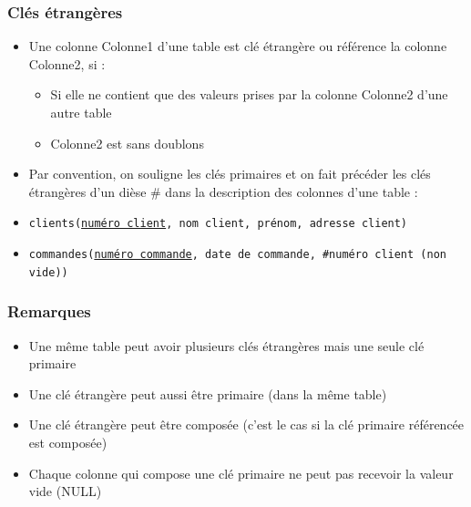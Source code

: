 \begin{frame}
  \frametitle{Clés étrangères}
  \begin{itemize}
    \item Une colonne Colonne1 d'une table est clé étrangère ou référence la
        colonne Colonne2, si :
        \begin{itemize}
            \item Si elle ne contient que des valeurs prises par la colonne
                Colonne2 d'une autre table
            \item Colonne2 est sans doublons
        \end{itemize}
    \item Par convention, on souligne les clés primaires et on fait précéder les clés étrangères d'un dièse \#
      dans la description des colonnes d'une table :
    \item \texttt{clients(\underline{numéro client}, nom client, prénom, adresse client)}
    \item \texttt{commandes(\underline{numéro commande}, date de commande, \#numéro client (non vide))}
  \end{itemize}
\end{frame}

\begin{frame}
  \frametitle{Remarques}
  \begin{itemize}
    \item Une même table peut avoir plusieurs clés étrangères mais une seule clé primaire
    \item Une clé étrangère peut aussi être primaire (dans la même table)
    \item Une clé étrangère peut être composée (c'est le cas si la clé primaire référencée est composée)
    \item Chaque colonne qui compose une clé primaire ne peut pas recevoir la valeur vide (NULL)
  \end{itemize}
\end{frame}

